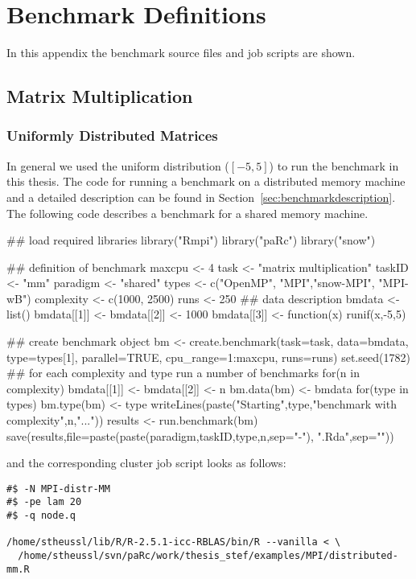\section{Benchmark Definitions}
\label{app:benchmark}
In this appendix the benchmark source files and job scripts are shown.

\subsection{Matrix Multiplication}

\subsubsection{Uniformly Distributed Matrices}

In general we used the uniform distribution ($[-5,5]$) to run the
benchmark in this thesis. The code for running a benchmark on a
distributed memory machine and a detailed description can
be found in Section~\ref{sec:benchmarkdescription}. The following code
describes a benchmark for a shared memory machine.

\begin{Scode}
## load required libraries
library("Rmpi")
library("paRc")
library("snow")

## definition of benchmark
maxcpu <- 4
task <- "matrix multiplication"
taskID <- "mm"
paradigm <- "shared"
types <- c("OpenMP", "MPI","snow-MPI", "MPI-wB")
complexity <- c(1000, 2500)
runs <- 250
## data description
bmdata <- list()
bmdata[[1]] <- bmdata[[2]] <- 1000
bmdata[[3]] <- function(x){
  runif(x,-5,5)
}

## create benchmark object
bm <- create.benchmark(task=task, data=bmdata,
                       type=types[1], parallel=TRUE,
                       cpu_range=1:maxcpu, runs=runs)
set.seed(1782)
## for each complexity and type run a number of benchmarks
for(n in complexity){
  bmdata[[1]] <- bmdata[[2]] <- n
  bm.data(bm) <- bmdata
  for(type in types){
    bm.type(bm) <- type
    writeLines(paste("Starting",type,"benchmark with complexity",n,"..."))
    results <- run.benchmark(bm)
    save(results,file=paste(paste(paradigm,taskID,type,n,sep="-"),
         ".Rda",sep=""))
  }
}
\end{Scode}

and the corresponding cluster job script looks as follows:

\begin{verbatim}
#$ -N MPI-distr-MM
#$ -pe lam 20
#$ -q node.q

/home/stheussl/lib/R/R-2.5.1-icc-RBLAS/bin/R --vanilla < \
  /home/stheussl/svn/paRc/work/thesis_stef/examples/MPI/distributed-mm.R
\end{verbatim}

